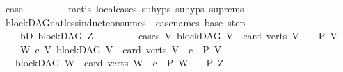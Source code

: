 \begin{isabellebody}
\ {\isacharquery}{\kern0pt}case\ \isanewline
\ \ \ \ \ \ \isamarkupfalse%
\ {\isacharparenleft}{\kern0pt}metis\ local{\isachardot}{\kern0pt}cases{\isacharparenleft}{\kern0pt}{}{\isacharparenright}{\kern0pt}\ su{\isachardot}{\kern0pt}hyps{\isacharparenleft}{\kern0pt}{}{\isacharparenright}{\kern0pt}\ su{\isachardot}{\kern0pt}hyps{\isacharparenleft}{\kern0pt}{}{\isacharparenright}{\kern0pt}\ su{\isachardot}{\kern0pt}prems{\isacharparenright}{\kern0pt}\ \ \ \isanewline
\ \ \isamarkupfalse%
\ \ \ \isanewline
{}\isamarkupfalse%
%
\endisatagproof
{\isafoldproof}%
%
\isadelimproof
\ \isanewline
%
\endisadelimproof
\isanewline
\isanewline
{}\isamarkupfalse%
\ blockDAG{\isacharunderscore}{\kern0pt}nat{\isacharunderscore}{\kern0pt}less{\isacharunderscore}{\kern0pt}induct{\isacharbrackleft}{\kern0pt}consumes\ {}{\isacharcomma}{\kern0pt}\ case{\isacharunderscore}{\kern0pt}names\ base\ step{\isacharbrackright}{\kern0pt}{\isacharcolon}{\kern0pt}\ \isanewline
\ \ \isanewline
\ \ \ \ bD{\isacharcolon}{\kern0pt}\ {\isachardoublequoteopen}blockDAG\ Z{\isachardoublequoteclose}\isanewline
\ \ \ \ \isanewline
\ \ \ \ cases{\isacharcolon}{\kern0pt}\ {\isachardoublequoteopen}{\isasymAnd}V{\isachardot}{\kern0pt}\ {\isacharparenleft}{\kern0pt}blockDAG\ V\ {\isasymLongrightarrow}\ card\ {\isacharparenleft}{\kern0pt}verts\ V{\isacharparenright}{\kern0pt}\ {\isacharequal}{\kern0pt}\ {}\ {\isasymLongrightarrow}\ P\ V{\isacharparenright}{\kern0pt}{\isachardoublequoteclose}\isanewline
\ \ \ \ {\isachardoublequoteopen}{\isasymAnd}W\ c{\isachardot}{\kern0pt}\ {\isacharparenleft}{\kern0pt}{\isasymAnd}V{\isachardot}{\kern0pt}\ {\isacharparenleft}{\kern0pt}blockDAG\ V\ {\isasymLongrightarrow}\ card\ {\isacharparenleft}{\kern0pt}verts\ V{\isacharparenright}{\kern0pt}\ {\isacharless}{\kern0pt}\ c\ {\isasymLongrightarrow}\ P\ V{\isacharparenright}{\kern0pt}{\isacharparenright}{\kern0pt}\ \isanewline
\ \ {\isasymLongrightarrow}\ {\isacharparenleft}{\kern0pt}blockDAG\ W\ {\isasymLongrightarrow}\ card\ {\isacharparenleft}{\kern0pt}verts\ W{\isacharparenright}{\kern0pt}\ {\isacharequal}{\kern0pt}\ c\ {\isasymLongrightarrow}\ P\ W{\isacharparenright}{\kern0pt}{\isachardoublequoteclose}\isanewline
\ \ \ {\isachardoublequoteopen}P\ Z{\isachardoublequoteclose}\isanewline
%
\isadelimproof
%
\endisadelimproof
%
\isatagproof
{}\isamarkupfalse%
\ {\isacharminus}{\kern0pt}\ \isanewline
\ \ \isamarkupfalse%

\end{isabellebody}

